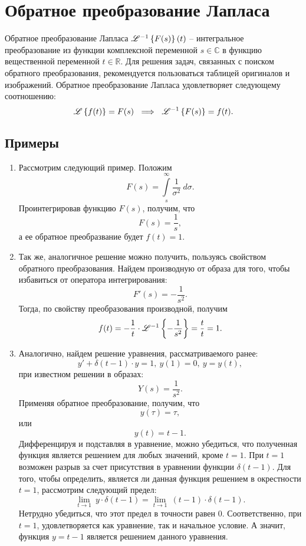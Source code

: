 \section{Обратное преобразование Лапласа}

	Обратное преобразование Лапласа $\mathscr{L}^{-1} \left\lbrace {F(s)} \right\rbrace \left( t \right)$ -- интегральное преобразование из функции комплексной переменной $s \in \mathbb{C}$ в функцию вещественной переменной $t \in \mathbb{R}$. Для решения задач, связанных с поиском обратного преобразования, рекомендуется пользоваться таблицей оригиналов и изображений. Обратное преобразование Лапласа удовлетворяет следующему соотношению:
	\[ \mathscr{L} \left\lbrace {f(t)} \right\rbrace = F(s) ~ \implies ~ \mathscr{L}^{-1} \left\lbrace {F(s)} \right\rbrace = f(t). \]

	\subsection{Примеры}

		\begin{enumerate}
			\item Рассмотрим следующий пример. Положим 
				\[ F(s) = \int\limits_{s}^{\infty} \frac{1}{\sigma^2} ~ d \sigma. \] 
				Проинтегрировав функцию $F(s)$, получим, что 
				\[ F(s) = \frac{1}{s}, \] 
				а ее обратное преобразвание будет $f(t) = 1$. 

			\item Так же, аналогичное решение можно получить, пользуясь свойством обратного преобразования. Найдем производную от образа для того, чтобы избавиться от оператора интегрирования: 
				\[ F'(s) = -\frac{1}{s^2}. \] 
				Тогда, по свойству преобразования производной, получим 
				\[ f(t) = -\frac{1}{t} \cdot \mathscr{L}^{-1} \left\lbrace {-\frac{1}{s^2}} \right\rbrace = \frac{t}{t} = 1. \]

			\item Аналогично, найдем решение уравнения, рассматриваемого ранее:
				\[ y' + \delta(t-1) \cdot y = 1, ~ y(1) = 0, ~ y = y(t), \]
				при известном решении в образах:
				\[ Y(s) = \frac{1}{s^2}. \]
				Применяя обратное преобразование, получим, что
				\[ y(\tau) = \tau, \]
				или
				\[ y(t) = t - 1. \]
				Дифференцируя и подставляя в уравнение, можно убедиться, что полученная функция является решением для любых значений, кроме $t = 1$. При $t = 1$ возможен разрыв за счет присутствия в уравнении функции $\delta(t-1)$.
				Для того, чтобы определить, является ли данная функция решением в окрестности $t = 1$, рассмотрим следующий предел: 
				\[ \lim_{t \to 1} ~ y \cdot \delta(t-1) = \lim_{t \to 1} ~ (t-1) \cdot \delta(t-1). \]
				Нетрудно убедиться, что этот предел в точности равен $0$. Соответственно, при $t = 1$, удовлетворяется как уравнение, так и начальное условие. А значит, функция $y = t - 1$ является решением данного уравнения.
				
		\end{enumerate}

